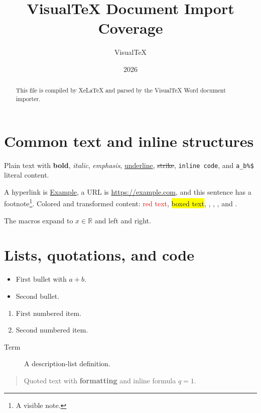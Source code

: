 \documentclass{article}
\title{VisualTeX Document Import Coverage}
\author{VisualTeX}
\date{2026}
\newcommand{\R}{\mathbb{R}}
\newcommand{\pair}[2]{#1 and #2}
\begin{document}
\maketitle

\begin{abstract}
This file is compiled by XeLaTeX and parsed by the VisualTeX Word document importer.
\end{abstract}

\section[Short title]{Common text and inline structures}
Plain text with \textbf{bold}, \textit{italic}, \emph{emphasis},
\underline{underline}, \sout{strike}, \texttt{inline code}, and
\verb|a_b%$| literal content.

A hyperlink is \href{https://example.com}{Example}, a URL is
\url{https://example.com}, and this sentence has a footnote\footnote{A visible note.}.
Colored and transformed content: \textcolor{red}{red text},
\colorbox{yellow}{boxed text}, ,
, , and
.

The macros expand to $x\in\R$ and \pair{left}{right}.

\section{Lists, quotations, and code}
\begin{itemize}
  \item First bullet with $a+b$.
  \item Second bullet.
\end{itemize}

\begin{enumerate}[label=(\alph*)]
  \item First numbered item.
  \item Second numbered item.
\end{enumerate}

\begin{description}
  \item[Term] A description-list definition.
\end{description}

\begin{quote}
Quoted text with \textbf{formatting} and inline formula $q=1$.
\end{quote}
\end{document}
